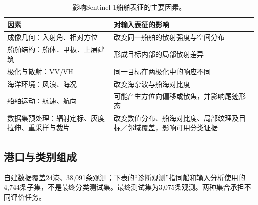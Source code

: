 \documentclass[journal,10pt,a4paper]{IEEEtran}
\begin{document}
\begin{table}[H]
\centering\footnotesize
\setcounter{table}{0}
\caption{影响Sentinel-1船舶表征的主要因素。}
\label{tab:1}
\setlength{\tabcolsep}{3pt}\renewcommand{\arraystretch}{1.2}
\begin{tabularx}{\linewidth}{LL}
\toprule
因素 & 对输入表征的影响 \\
\midrule
成像几何：入射角、相对方位 & 改变同一船舶的散射强度与空间分布 \\
船舶结构：船体、甲板、上层建筑 & 形成目标内部的局部散射差异 \\
极化与散射：VV/VH & 同一目标在两极化中的响应不同 \\
海洋环境：风浪、海况 & 改变海杂波与船海对比度 \\
船舶运动：航速、航向 & 可能产生方位向偏移或散焦，并影响尾迹形态 \\
数据集预处理：辐射定标、灰度拉伸、重采样与裁片 & 改变数值分布、船海对比度、局部纹理及目标／邻域覆盖，影响可用分类证据 \\
\bottomrule
\end{tabularx}
\end{table}

\subsection{港口与类别组成}\label{ux6e2fux53e3ux4e0eux7c7bux522bux7ec4ux6210}

自建数据覆盖24港、38,091条观测；下表的``诊断观测''指同船和输入分析使用的4,744条子集，不是最终分类测试集。最终测试集为3,075条观测。两种集合承担不同评价任务。
\end{document}
